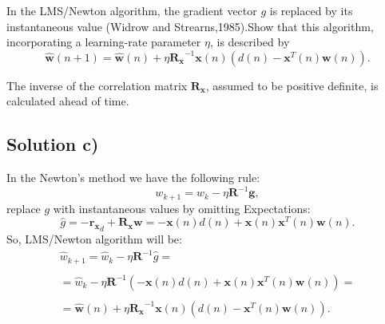 \documentclass[a4paper, 12pt]{article}
\begin{document}
In the LMS/Newton algorithm, the gradient vector $g$ is replaced by its instantaneous value (Widrow and
Strearns,1985).Show that this algorithm, incorporating a learning-rate parameter $\eta$, is described by
\begin{equation*}
  \mathbf{\hat{w}}(n+1)= \mathbf{\hat{w}}(n)+\eta \mathbf{R_x}^{-1} \mathbf{x}(n)(d(n) - \mathbf{x}^T(n) \mathbf{w}(n) ).
\end{equation*}

The inverse of the correlation matrix $\mathbf{R_x}$, assumed to be positive definite, is calculated ahead of time.
\subsection*{Solution c)}
In the Newton's method we have the following rule:
\begin{equation*}
  w_{k+1} = w_{k} - \eta \mathbf{R}^{-1}\mathbf{g},
\end{equation*}
replace $g$ with instantaneous values by omitting Expectations:
\begin{equation*}
  \hat{g} = - \mathbf{r_x}_d +\mathbf{R_x}\mathbf{w} = -\mathbf{x}(n)d(n) + \mathbf{x}(n)\mathbf{x}^T(n)\mathbf{w}(n).
\end{equation*}
So, LMS/Newton algorithm will be:
$$
\begin{array}{l}
  \hat{w}_{k+1} = \hat{w}_{k} - \eta \mathbf{R}^{-1}\hat{g} =\\
  \\
  =\hat{w}_{k} - \eta \mathbf{R}^{-1}(-\mathbf{x}(n)d(n) + \mathbf{x}(n)\mathbf{x}^T(n)\mathbf{w}(n)) =\\
  \\
  =\mathbf{\hat{w}}(n)+\eta \mathbf{R_x}^{-1} \mathbf{x}(n)(d(n) - \mathbf{x}^T(n) \mathbf{w}(n) ).
\end{array}
$$
\end{document}
